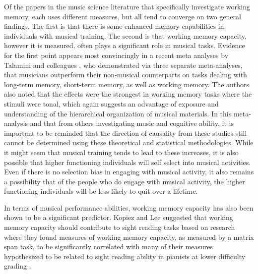 \documentclass[12pt,]{book}
\begin{document}
Of the papers in the music science literature that specifically investigate working memory, each uses different measures, but all tend to converge on two general findings.
The first is that there is some enhanced memory capabilities in individuals with musical training.
The second is that working memory capacity, however it is measured, often plays a significant role in musical tasks.
Evidence for the first point appears most convincingly in a recent meta analyses by Talamini and colleagues \citep{talaminiMusiciansHaveBetter2017}, who demonstrated via three separate meta-analyses, that musicians outperform their non-musical counterparts on tasks dealing with long-term memory, short-term memory, as well as working memory.
The authors also noted that the effects were the strongest in working memory tasks where the stimuli were tonal, which again suggests an advantage of exposure and understanding of the hierarchical organization of musical materials.
In this meta-analysis and that from others investigating music and cognitive ability, it is important to be reminded that the direction of causality from these studies still cannot be determined using these theoretical and statistical methodologies.
While it might seem that musical training tends to lead to these increases, it is also possible that higher functioning individuals will self select into musical activities.
Even if there is no selection bias in engaging with musical activity, it also remains a possibility that of the people who do engage with musical activity, the higher functioning individuals will be less likely to quit over a lifetime.

In terms of musical performance abilities, working memory capacity has also been shown to be a significant predictor.
Kopiez and Lee suggested that working memory capacity should contribute to sight reading tasks based on research where they found measures of working memory capacity, as measured by a matrix span task, to be significantly correlated with many of their measures hypothesized to be related to sight reading ability in pianists at lower difficulty grading \citep{kopiezDynamicModelSkills2006, kopiezGeneralModelSkills2008}.
\end{document}

